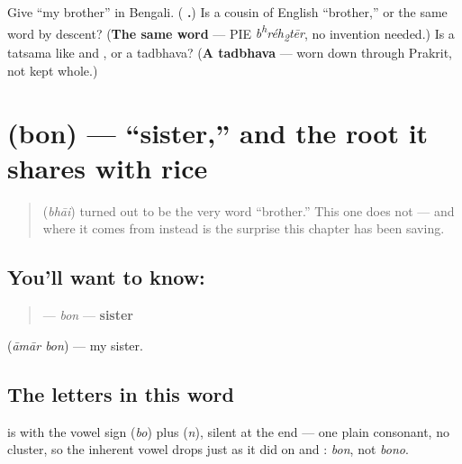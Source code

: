 \begin{tcolorbox}[breakable,colback=teal!4,colframe=teal!35!black,title={Before you move on}]
Give \textquotedblleft{}my brother\textquotedblright{} in Bengali. (\textbf{ .}) Is  a cousin of English \textquotedblleft{}brother,\textquotedblright{} or the same word by descent? (\textbf{The same word} — PIE \emph{b\textsuperscript{h}réh\textsubscript{2}tēr}, no invention needed.) Is  a tatsama like  and , or a tadbhava? (\textbf{A tadbhava} — worn down through Prakrit, not kept whole.)
\end{tcolorbox}
\section[bon]{ (bon) — \textquotedblleft{}sister,\textquotedblright{} and the root it shares with rice}

\label{lesson:BN-C11-bon}



\begin{quote}
 (\emph{bhāi}) turned out to be the very word \textquotedblleft{}brother.\textquotedblright{} This one does not — and where it comes from instead is the surprise this chapter has been saving.
\end{quote}

\subsection*{You'll want to know: }
\begin{quote}
\textbf{} — \emph{bon} — \textbf{sister}
\end{quote}

\textbf{ } (\emph{āmār bon}) — my sister.

\subsection*{The letters in this word}
\textbf{} is \textbf{} with the vowel sign \textbf{} (\emph{bo}) plus \textbf{} (\emph{n}), silent at the end — one plain consonant, no cluster, so the inherent vowel drops just as it did on  and : \emph{bon}, not \emph{bono}.

